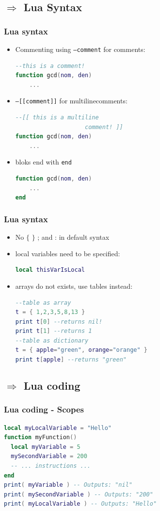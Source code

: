 \documentclass{beamer}
\begin{document}
\begin{frame}[fragile]
    \section{$ \Rightarrow $ Lua Syntax}
    \frametitle{Lua syntax}
    \begin{itemize}
        \item{Commenting using \texttt{--comment} for comments:}
            \begin{lstlisting}[language=lua]
--this is a comment!
function gcd(nom, den)
    ...
            \end{lstlisting}
        \item{\texttt{--[[comment]]} for multilinecomments:}
            \begin{lstlisting}[language=lua]
--[[ this is a multiline
                    comment! ]]
function gcd(nom, den)
    ...
            \end{lstlisting}
        \item{bloks end with \texttt{end}}
        \begin{lstlisting}[language=lua]
function gcd(nom, den)
    ...
end
            \end{lstlisting}
\end{itemize}
\end{frame}

\begin{frame}[fragile]
    \frametitle{Lua syntax}
    \begin{itemize}
        \item{No $\lbrace$ $\rbrace$ ; and : in default syntax}
        \item{local variables need to be specified:}
            \begin{lstlisting}[language=lua]
local thisVarIsLocal
            \end{lstlisting}
        \item{arrays do not exists, use tables instead:}
            \begin{lstlisting}[language=lua]
--table as array
t = { 1,2,3,5,8,13 }
print t[0] --returns nil!
print t[1] --returns 1
--table as dictionary
t = { apple="green", orange="orange" }
print t[apple] --returns "green"
            \end{lstlisting}
\end{itemize}
\end{frame}

\begin{frame}[fragile]
    \section{$ \Rightarrow $ Lua coding}
    \frametitle{Lua coding - Scopes}
    \begin{lstlisting}[language=lua]
local myLocalVariable = "Hello"
function myFunction()
  local myVariable = 5
  mySecondVariable = 200
  -- ... instructions ...
end
print( myVariable ) -- Outputs: "nil"
print( mySecondVariable ) -- Outputs: "200"
print( myLocalVariable ) -- Outputs: "Hello"
    \end{lstlisting}
\end{frame}
\end{document}
